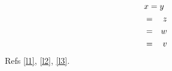 \documentclass{article}
\begin{document}
\begin{eqnarray}
\lefteqn{x = y} \cr
&=& z \label{l1}\\
&=& w \label{l3} \cr
&=& v \label{l2}
\end{eqnarray}
Refs \ref{l1}, \ref{l2}, \ref{l3}.
\end{document}
